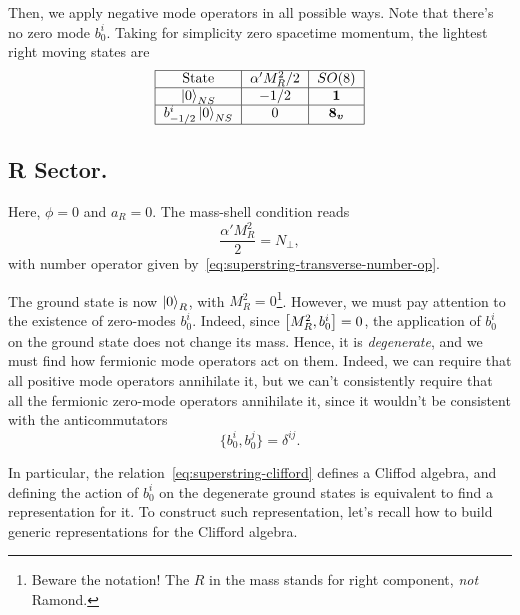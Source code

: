 Then, we apply negative mode operators in all possible ways. Note that there's no zero mode $b^i_0$. Taking for simplicity zero spacetime momentum, the lightest right moving states are
\begin{equation}\label{eq:table-NS}
\begin{tabular}{|c|c|c|} \hline
    State & $\alpha' M^2_R / 2$ & $SO(8)$ \\ \hline
    $\ket{0}_{NS}$   & $-1/2$   & $\i$   \\ \hline
    $b^i_{-1/2} \ket{0}_{NS}$   & $0$   & $\v$  \\ \hline
\end{tabular}
\end{equation}

\subsection{R Sector.}\label{sec:R-sector}
Here, $\phi = 0$ and $a_R = 0$. The mass-shell condition reads
\begin{equation}\label{eq:R-mass-shell}
    \frac{\alpha' M^2_R}{2} = N_\perp,
\end{equation}
with number operator given by~\eqref{eq:superstring-transverse-number-op}.

The ground state is now $\ket{0}_R$, with $M_R^2 = 0$\footnote{Beware the notation! The $R$ in the mass stands for right component, \emph{not} Ramond.}. However, we must pay attention to the existence of zero-modes $b^i_0$. Indeed, since $\comm{M^2_R}{b^i_0} = 0$, the application of $b^i_0$ on the ground state does not change its mass. Hence, it is \emph{degenerate}, and we must find how fermionic mode operators act on them. Indeed, we can require that all positive mode operators annihilate it, but we can't consistently require that all the fermionic zero-mode operators annihilate it, since it wouldn't be consistent with the anticommutators
\begin{equation}\label{eq:superstring-clifford}
    \{ b^i_0, b^j_0 \} = \delta^{ij}.
\end{equation}

In particular, the relation~\eqref{eq:superstring-clifford} defines a Cliffod algebra, and defining the action of $b^i_0$ on the degenerate ground states is equivalent to find a representation for it. To construct such representation, let's recall how to build generic representations for the Clifford algebra.

